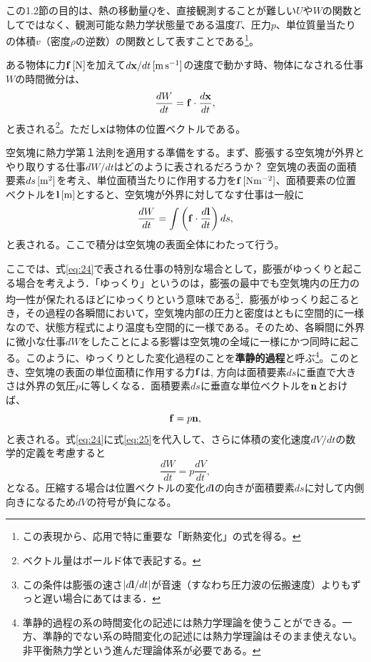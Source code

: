 \documentclass{ltjsarticle}
\begin{document}
この1.2節の目的は、熱の移動量$Q$を、直接観測することが難しい$U$や$W$の関数としてではなく、観測可能な熱力学状態量である温度$T$、圧力$p$、単位質量当たりの体積$v$（密度$\rho$の逆数）の関数として表すことである\footnote{この表現から、応用で特に重要な「断熱変化」の式を得る。}。

ある物体に力$\bf{f}\,[\rm{N}]$を加えて$d{\bf x}/dt\,[\rm{m\,s^{-1}}]$の速度で動かす時、物体になされる仕事$W$の時間微分は、
\begin{equation}\label{eq:23}
 \frac{dW}{dt}={\bf f}\cdot \frac{d{\bf x}}{dt},
\end{equation}
と表される\footnote{ベクトル量はボールド体で表記する。}。ただし{\bf x}は物体の位置ベクトルである。

空気塊に熱力学第１法則を適用する準備をする。まず、膨張する空気塊が外界とやり取りする仕事$dW/dt$はどのように表されるだろうか？
空気塊の表面の面積要素$ds\,[\rm{m^{2}}]$を考え、単位面積当たりに作用する力を${\bf f}\,[\rm{N m^{-2}}]$、面積要素の位置ベクトルを${\bf l}\,[\rm{m}]$とすると、空気塊が外界に対してなす仕事は一般に
\begin{equation}\label{eq:24}
 \frac{dW}{dt}=\int{\bigg (}{\bf f}\cdot \frac{d{\bf l}}{dt}{\bigg )}\,ds,
\end{equation}
と表される。ここで積分は空気塊の表面全体にわたって行う。

ここでは、式\eqref{eq:24}で表される仕事の特別な場合として，膨張がゆっくりと起こる場合を考えよう．「ゆっくり」というのは，膨張の最中でも空気塊内の圧力の均一性が保たれるほどにゆっくりという意味である\footnote{この条件は膨張の速さ$| d{\bf l}/dt |$が音速（すなわち圧力波の伝搬速度）よりもずっと遅い場合にあてはまる．}．膨張がゆっくり起こるとき，その過程の各瞬間において，空気塊内部の圧力と密度はともに空間的に一様なので、状態方程式により温度も空間的に一様である。そのため、各瞬間に外界に微小な仕事$dW$をしたことによる影響は空気塊の全域に一様にかつ同時に起こる。このように、ゆっくりとした変化過程のことを{\bf 準静的過程}と呼ぶ\footnote{準静的過程の系の時間変化の記述には熱力学理論を使うことができる。一方、準静的でない系の時間変化の記述には熱力学理論はそのまま使えない。非平衡熱力学という進んだ理論体系が必要である。}。このとき、空気塊の表面の単位面積に作用する力${\bf f}$は, 方向は面積要素$ds$に垂直で大きさは外界の気圧$p$に等しくなる．面積要素$ds$に垂直な単位ベクトルを${\bf n}$とおけば、
\begin{equation}\label{eq:25}
 {\bf f}=p{\bf n},
\end{equation}
と表される。式\eqref{eq:24}に式\eqref{eq:25}を代入して、さらに体積の変化速度$dV/dt$の数学的定義を考慮すると
\begin{equation}\label{eq:26}
 \frac{dW}{dt}=p\frac{dV}{dt},
\end{equation}
となる。圧縮する場合は位置ベクトルの変化$d{\bf l}$の向きが面積要素$ds$に対して内側向きになるため$dV$の符号が負になる。
\end{document}
